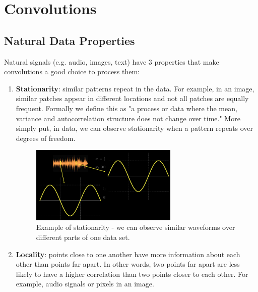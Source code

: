 \chapter{Convolutions}
    \section{Natural Data Properties}
    Natural signals (e.g. audio, images, text) have 3 properties that make convolutions a good choice to process them:
    \begin{enumerate}
        \item \textbf{Stationarity}: similar patterns repeat in the data. 
        For example, in an image, similar patches appear in different locations and not all patches are equally frequent. Formally we define this as "a process or data where the mean, variance and autocorrelation structure does not change over time." More simply put, in data, we can observe stationarity when a pattern repeats over degrees of freedom.
        
        \begin{figure}[H]
        \begin{center}
        \includegraphics[width=200pt]{labs/03/images/stationarity.png}
        \end{center} 
        \captionsetup{justification=centering, margin=2cm}
        \caption{Example of stationarity - we can observe similar waveforms over different parts of one data set.}
        \end{figure}
        
        \item \textbf{Locality}:  points close to one another have more information about each other than points far apart. 
        In other words, two points far apart are less likely to have a higher correlation than two points closer to each other. 
        For example, audio signals or pixels in an image.
        

\end{enumerate}
